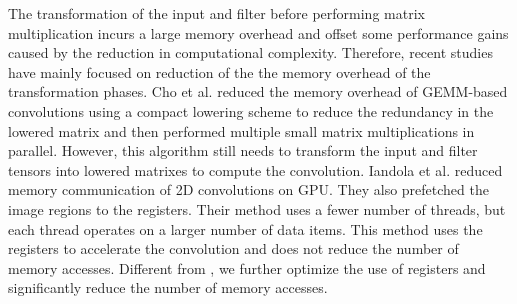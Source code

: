 The transformation of the input and filter before performing matrix multiplication incurs a large memory
overhead and offset some performance gains caused by the reduction in computational complexity. Therefore, recent studies have mainly focused on reduction of the the memory overhead of the transformation phases. Cho et al. \cite{cho2017mec} reduced the memory overhead of GEMM-based convolutions using a
compact lowering scheme to reduce the redundancy in the lowered matrix and then performed multiple small matrix multiplications in parallel.
However, this algorithm still needs to transform the input and filter tensors into lowered matrixes to compute the convolution.
Iandola et al. \cite{Iandola2014Communication} reduced memory communication of 2D convolutions on GPU. They also prefetched the image regions to the registers. {\color{red}Their method uses a fewer number of threads, but each thread operates on a larger number of data items.} This method uses the registers to accelerate the convolution and does not reduce the number of
memory accesses. Different from \cite{Iandola2014Communication}, we further optimize the use of registers and significantly reduce the
number of memory accesses.
